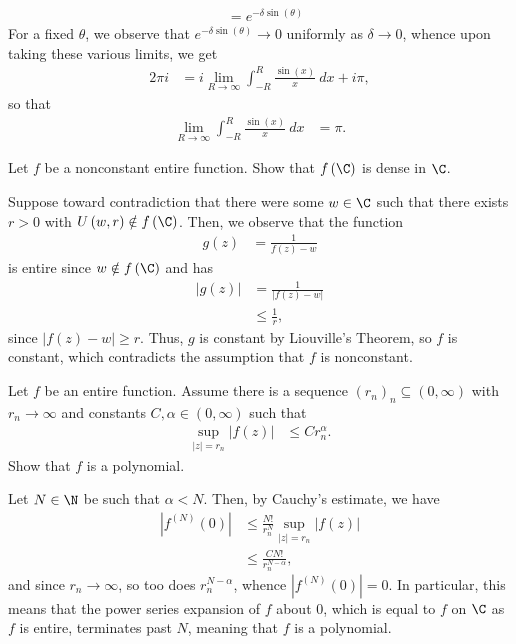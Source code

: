 \documentclass[10pt]{mypackage}
\begin{document}
\begin{solution}
\begin{align*}
                                                  &= e^{-\delta\sin\left( \theta \right)}
  \end{align*}
  For a fixed $\theta$, we observe that $e^{-\delta\sin\left( \theta \right)}\rightarrow 0$ uniformly as $\delta\rightarrow 0$, whence upon taking these various limits, we get
  \begin{align*}
    2\pi i &= i \lim_{R\rightarrow\infty}\int_{-R}^{R} \frac{\sin\left( x \right)}{x}\:dx + i\pi,
  \end{align*}
  so that
  \begin{align*}
    \lim_{R\rightarrow \infty} \int_{-R}^{R} \frac{\sin\left( x \right)}{x}\:dx &= \pi.
  \end{align*}
\end{solution}
\begin{problem}[Problem 2]
  Let $f$ be a nonconstant entire function. Show that $f\left( \C \right)$ is dense in $\C$.
\end{problem}
\begin{solution}
  Suppose toward contradiction that there were some $w\in \C$ such that there exists $r > 0$ with $U\left( w,r \right)\notin f\left( \C \right)$. Then, we observe that the function
  \begin{align*}
    g(z) &= \frac{1}{f(z) - w}
  \end{align*}
  is entire since $w\notin f\left( \C \right)$ and has
  \begin{align*}
    \left\vert g(z) \right\vert &= \frac{1}{\left\vert f(z) - w \right\vert}\\
                                &\leq \frac{1}{r},
  \end{align*}
  since $\left\vert f(z)- w \right\vert\geq r$. Thus, $g$ is constant by Liouville's Theorem, so $f$ is constant, which contradicts the assumption that $f$ is nonconstant.
\end{solution}
\begin{problem}[Problem 3]
  Let $f$ be an entire function. Assume there is a sequence $\left( r_n \right)_n\subseteq \left( 0,\infty \right)$ with $r_n\rightarrow\infty$ and constants $C,\alpha\in \left( 0,\infty \right)$ such that
  \begin{align*}
    \sup_{|z| = r_n} \left\vert f(z) \right\vert &\leq Cr_n^{\alpha}.
  \end{align*}
  Show that $f$ is a polynomial.
\end{problem}
\begin{solution}
  Let $N\in \N$ be such that $\alpha < N$. Then, by Cauchy's estimate, we have
  \begin{align*}
    \left\vert f^{(N)}\left( 0 \right) \right\vert &\leq \frac{N!}{r_n^{N}} \sup_{|z| = r_n} \left\vert f(z) \right\vert\\
                                                   &\leq \frac{CN!}{r_n^{N-\alpha}},
  \end{align*}
  and since $r_n\rightarrow\infty$, so too does $r_n^{N-\alpha}$, whence $\left\vert f^{(N)}\left( 0 \right) \right\vert = 0$. In particular, this means that the power series expansion of $f$ about $0$, which is equal to $f$ on $\C$ as $f$ is entire, terminates past $N$, meaning that $f$ is a polynomial.
\end{solution}
\end{document}
